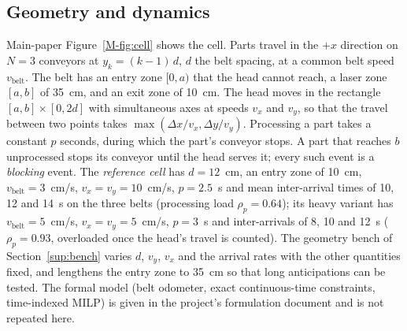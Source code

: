 \documentclass[11pt,a4paper]{article}
\newcommand{\vb}{v_{\mathrm{belt}}}
\begin{document}
\subsection{Geometry and dynamics}
Main-paper Figure~\ref{M-fig:cell} shows the cell. Parts travel in the $+x$ direction on $N=3$
conveyors at $y_k=(k-1)\,d$, $d$ the belt spacing, at a common belt speed $\vb$. The belt
has an entry zone $[0,a)$ that the head cannot reach, a laser zone $[a,b]$ of 35~cm, and
an exit zone of 10~cm. The head moves in the rectangle $[a,b]\times[0,2d]$ with
simultaneous axes at speeds $v_x$ and $v_y$, so that the travel between two points takes
$\max(\Delta x/v_x,\Delta y/v_y)$. Processing a part takes a constant $p$ seconds, during
which the part's conveyor stops. A part that reaches $b$ unprocessed stops its conveyor
until the head serves it; every such event is a \emph{blocking} event. The \emph{reference
cell} has $d=12$~cm, an entry zone of 10~cm, $\vb=3$~cm/s, $v_x=v_y=10$~cm/s, $p=2.5$~s
and mean inter-arrival times of 10, 12 and 14~s on the three belts (processing load
$\rho_p=0.64$); its heavy variant has $\vb=5$~cm/s, $v_x=v_y=5$~cm/s, $p=3$~s and
inter-arrivals of 8, 10 and 12~s ($\rho_p=0.93$, overloaded once the head's travel is
counted). The geometry bench of Section~\ref{sup:bench} varies $d$, $v_y$, $v_x$ and the
arrival rates with the other quantities fixed, and lengthens the entry zone to 35~cm so
that long anticipations can be tested. The formal model (belt odometer, exact
continuous-time constraints, time-indexed MILP) is given in the project's formulation
document and is not repeated here.
\end{document}
